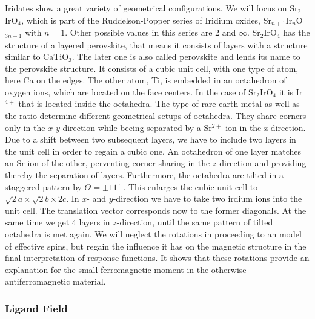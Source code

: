 Iridates show a great variety of geometrical configurations. 
We will focus on Sr$_2$IrO$_4$, which is part of the Ruddelson-Popper series of Iridium oxides, Sr$_{n+1}$Ir$_{n}$O$_{3n+1}$ with $n =1$. 
Other possible values in this series are 2 and $\infty$.
Sr$_2$IrO$_4$ has the structure of a layered perovskite, that means it consists of layers with a structure similar to CaTiO$_3$.
The later one is also called perovskite and lends its name to the perovskite structure.
It consists of a cubic unit cell, with one type of atom, here Ca on the edges. 
The other atom, Ti, is embedded in an octahedron of 
oxygen ions, which are located on the face centers.
%
%
In the case of Sr$_2$IrO$_4$ it is Ir$^{4+}$ that is located  inside the octahedra. 
The type of rare earth metal as well as the ratio determine different geometrical setups of octahedra. 
They share corners only in the $x$-$y$-direction while beeing separated by a Sr$^{2+}$ ion in the z-direction.
Due to a shift between two subsequent layers, we have to include two layers in the unit cell in order to regain a cubic one.
An octahedron of one layer matches an Sr ion of the other, perventing  corner sharing in the $z$-direction and providing thereby the separation of layers. 
% 
Furthermore, the octahedra are tilted in a staggered pattern by $\Theta = \pm 11^{\circ}$ \cite{PhysRevB.49.9198}.
This enlarges the cubic unit cell to $\sqrt2 a\times\sqrt 2b \times 2c$.
In $x$- and $y$-direction we have to take two irdium ions into the unit cell. The translation vector corresponds now to the former diagonals.
At the same time we get 4 layers in $z$-direction, until the same pattern of tilted octahedra is met again. 
%
We will neglect the rotations in proceeding to an model of effective spins, but regain the influence it has on the magnetic structure in the final interpretation of 
response functions. It shows that these rotations provide an explanation for the small ferromagnetic moment in the otherwise antiferromagnetic material. 

\subsubsection{Ligand Field}

